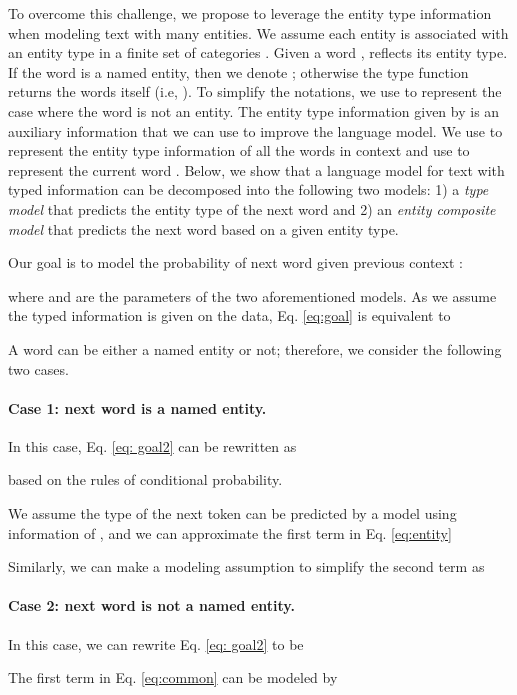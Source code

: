 \documentclass[11pt,a4paper]{article}
\begin{document}
To overcome this challenge, we propose to leverage the entity type information when modeling text with many entities. 
We assume each entity is associated with an entity type in a finite set of categories . Given a word ,  reflects its entity type. If the word is a named entity, then we denote ; otherwise the type function returns the words itself (i.e, ). To simplify the notations, we use  to represent the case where the word is not an entity.
The entity type information given by  is an auxiliary information that we can use to improve the language model. We use  to represent the entity type information of all the words in context  and use  to represent the current word . Below, we show that a language model for text with typed information can be decomposed into the following two models: 1) a {\it type model } that predicts the entity type of the next word and 2) an {\it entity composite model } that predicts the next word based on a given entity type.  

Our goal is to model the probability of next word  given previous context :

where  and  are the parameters of the two aforementioned models.
As we assume the typed information is given on the data,
Eq. \eqref{eq:goal} is equivalent to  


A word can be either a named entity or not; therefore, we consider the following two cases.  

\paragraph{\bf Case 1: next word is a named entity.} In this case, Eq. \eqref{eq: goal2} can be rewritten as 

based on the rules of conditional probability. 

We assume the type of the next token  can be predicted by a model  using information of , and we can approximate the first term in Eq. \eqref{eq:entity} 

Similarly, we can make a modeling assumption to simplify the second term as 



\paragraph{\bf Case 2: next word is not a named entity.}  In this case, we can rewrite Eq. \eqref{eq: goal2} to be


The first term in Eq. \eqref{eq:common} can be modeled by 
\end{document}
